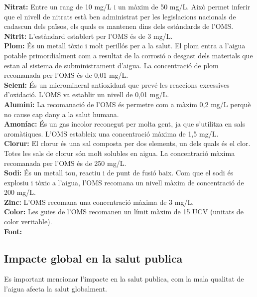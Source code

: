 \textbf{Nitrat:} Entre un rang de 10 mg/L i un màxim de 50 mg/L. Això permet inferir que el nivell de nitrats està ben administrat per les legislacions nacionals de cadascun dels països, els quals es mantenen dins dels estàndards de l’OMS.\\

\textbf{Nitrit:} L’estàndard establert per l’OMS és de 3 mg/L.\\

\textbf{Plom:} És un metall tòxic i molt perillós per a la salut. El plom entra a l’aigua potable primordialment com a resultat de la corrosió o desgast dels materials que estan al sistema de subministrament d’aigua. La concentració de plom recomanada per l’OMS és de 0,01 mg/L.\\

\textbf{Seleni:} És un micromineral antioxidant que prevé les reaccions excessives d’oxidació. L’OMS va establir un nivell de 0,01 mg/L.\\

\textbf{Alumini:} La recomanació de l’OMS és permetre com a màxim 0,2 mg/L perquè no cause cap dany a la salut humana.\\

\textbf{Amoníac:} És un gas incolor reconegut per molta gent, ja que s’utilitza en sals aromàtiques. L’OMS estableix una concentració màxima de 1,5 mg/L.\\

\textbf{Clorur:} El clorur és una sal composta per dos elements, un dels quals és el clor. Totes les sals de clorur són molt solubles en aigua. La concentració màxima recomanada per l’OMS és de 250 mg/L.\\


\textbf{Sodi:} És un metall tou, reactiu i de punt de fusió baix. Com que el sodi és explosiu i tòxic a l’aigua, l’OMS recomana un nivell màxim de concentració de 200 mg/L.\\

\textbf{Zinc:} L’OMS recomana una concentració màxima de 3 mg/L.\\

\textbf{Color:} Les guies de l’OMS recomanen un límit màxim de 15 UCV (unitats de color veritable).\\

\textbf{Font:}~\cite{Estan}
\subsection{Impacte global en la salut publica}
Es important mencionar l'impacte en la salut publica, com la mala qualitat de l'aigua afecta la salut globalment.

